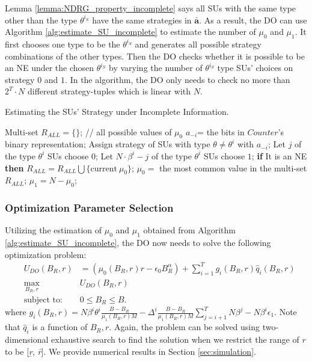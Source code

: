 \documentclass[journal]{IEEEtran}
\begin{document}
Lemma \ref{lemma:NDRG_property_incomplete} says all SUs with the same type other than the type $\theta^{i_S}$ have the same strategies in $\mathbf{\bar{a}}$.
As a result, the DO can use Algorithm \ref{alg:estimate_SU_incomplete} to estimate the number of $\mu_0$ and $\mu_1$. It first chooses one type to be the $\theta^{i_S}$ and generates all possible strategy combinations of the other types. Then the DO checks whether it is possible to be an NE under the chosen $\theta^{i_S}$ by varying the number of $\theta^{i_S}$ type SUs' choices on strategy $0$ and $1$. In the algorithm, the DO only needs to check no more than $2^T\cdot N$ different strategy-tuples which is linear with $N$.

\begin{algorithm}[tp]
\caption {Estimating the SUs' Strategy under Incomplete Information.}
\label{alg:estimate_SU_incomplete}
\begin{algorithmic}[1]
\STATE Multi-set $R_{ALL}=\{\}$; // all possible values of $\mu_0$
\STATE $a_{-i}$= the bits in $Counter$'s binary representation;
\STATE Assign strategy of SUs with type $\theta\neq\theta^i$ with $a_{-i}$;
\STATE Let $j$ of the type $\theta^i$ SUs choose $0$;
\STATE Let $N\cdot\beta^i-j$ of the type $\theta^i$ SUs choose $1$;
\STATE \textbf{if} {It is an NE} \textbf{then} $R_{ALL} = R_{ALL}\bigcup \{\textrm{current}\ \mu_0\}$;
\ENDFOR
\ENDFOR
\ENDFOR
\STATE $\mu_0=$ the most common value in the multi-set $R_{ALL}$;
\STATE $\mu_1=N-\mu_0$;
\end{algorithmic}
\end{algorithm}

\subsubsection{Optimization Parameter Selection}

Utilizing the estimation of $\mu_0$ and $\mu_1$ obtained from Algorithm \ref{alg:estimate_SU_incomplete}, the DO now needs to solve the following optimization problem:
\begin{eqnarray}
\label{eqn:max_udo3}
&U_{DO}(B_R, r)&=(\mu_0(B_R, r)r-\epsilon_0B_R^{\alpha}) + \sum_{i=1}^Tg_i(B_R, r)\hat{q}_i(B_R, r) \nonumber\\
&\max_{B_R, r}& U_{DO}(B_R, r) \nonumber\\
&\textrm{subject to:}& 0\leq B_R\leq  B.
\end{eqnarray}
where
$
g_i(B_R, r)=N\beta^i\theta^i\frac{B-B_R}{\mu_1(B_R, r)M} - \Delta^i\frac{B-B_R}{\mu_1(B_R, r)M}\sum_{j=i+1}^TN\beta^j -N\beta^i\epsilon_1
$.
Note that $\hat{q}_i$ is a function of $B_R, r$. Again, the problem can be solved using two-dimensional exhaustive search to find the solution when we restrict the range of $r$ to be [\emph{\b{r}}, \emph{\={r}}]. We provide numerical results in Section \ref{sec:simulation}.
\end{document}
